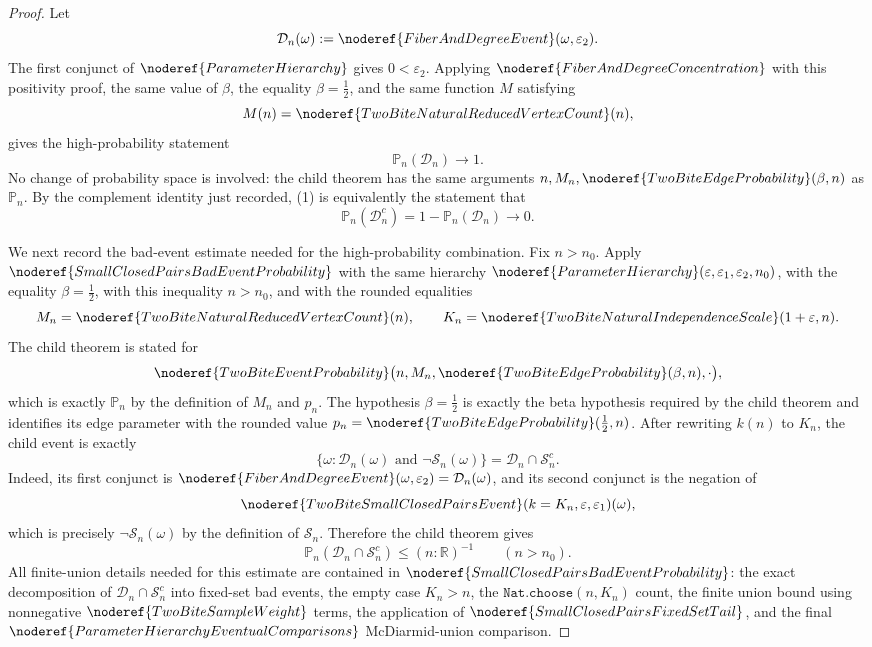 \begin{proof}
Let
\[
\mathcal D_n(\omega):=\noderef{FiberAndDegreeEvent}(\omega,\varepsilon_2).
\]
The first conjunct of \(\noderef{ParameterHierarchy}\) gives
\(0<\varepsilon_2\).  Applying \(\noderef{FiberAndDegreeConcentration}\) with
this positivity proof, the same value of \(\beta\), the equality
\(\beta=\frac12\), and the same function \(M\) satisfying
\[
M(n)=\noderef{TwoBiteNaturalReducedVertexCount}(n),
\]
gives the high-probability statement
\[
\mathbb P_n(\mathcal D_n)\to1. \tag{1}
\]
No change of probability space is involved: the child theorem has the same
arguments \(n,M_n,\noderef{TwoBiteEdgeProbability}(\beta,n)\) as
\(\mathbb P_n\).  By the complement identity just recorded, (1) is
equivalently the statement that
\[
\mathbb P_n(\mathcal D_n^c)=1-\mathbb P_n(\mathcal D_n)\to0. \tag{1a}
\]

We next record the bad-event estimate needed for the high-probability
combination.  Fix \(n>n_0\).  Apply
\(\noderef{SmallClosedPairsBadEventProbability}\) with the same hierarchy
\(\noderef{ParameterHierarchy}(\varepsilon,\varepsilon_1,\varepsilon_2,n_0)\),
with the equality \(\beta=\frac12\), with this inequality \(n>n_0\), and with
the rounded equalities
\[
M_n=\noderef{TwoBiteNaturalReducedVertexCount}(n),\qquad
K_n=\noderef{TwoBiteNaturalIndependenceScale}(1+\varepsilon,n).
\]
The child theorem is stated for
\[
\noderef{TwoBiteEventProbability}
 \bigl(n,M_n,\noderef{TwoBiteEdgeProbability}(\beta,n),\cdot\bigr),
\]
which is exactly \(\mathbb P_n\) by the definition of \(M_n\) and \(p_n\).
The hypothesis \(\beta=\frac12\) is exactly the beta hypothesis required by
the child theorem and identifies its edge parameter with the rounded value
\(p_n=\noderef{TwoBiteEdgeProbability}(\frac12,n)\).
After rewriting \(k(n)\) to \(K_n\), the child event is exactly
\[
\{\omega:\mathcal D_n(\omega)\text{ and }\neg\mathcal S_n(\omega)\}
=\mathcal D_n\cap\mathcal S_n^c.
\]
Indeed, its first conjunct is
\(\noderef{FiberAndDegreeEvent}(\omega,\varepsilon_2)=\mathcal D_n(\omega)\),
and its second conjunct is the negation of
\[
\noderef{TwoBiteSmallClosedPairsEvent}
  (k=K_n,\varepsilon,\varepsilon_1)(\omega),
\]
which is precisely \(\neg\mathcal S_n(\omega)\) by the definition of
\(\mathcal S_n\).  Therefore the child theorem gives
\[
\mathbb P_n(\mathcal D_n\cap\mathcal S_n^c)
\le (n:\mathbb R)^{-1} \qquad (n>n_0). \tag{2}
\]
All finite-union details needed for this estimate are contained in
\(\noderef{SmallClosedPairsBadEventProbability}\): the exact decomposition
of \(\mathcal D_n\cap\mathcal S_n^c\) into fixed-set bad events, the empty
case \(K_n>n\), the \(\texttt{Nat.choose}(n,K_n)\) count, the finite union
bound using nonnegative \(\noderef{TwoBiteSampleWeight}\) terms, the
application of \(\noderef{SmallClosedPairsFixedSetTail}\), and the final
\(\noderef{ParameterHierarchyEventualComparisons}\) McDiarmid-union
comparison.


\end{proof}
